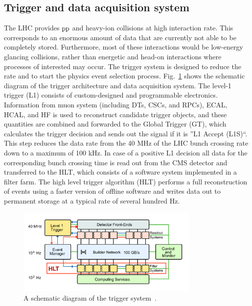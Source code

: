 \subsection*{Trigger and data acquisition system}
The LHC provides $\mathrm{p}\mathrm{p}$ and heavy-ion collisions at high interaction rate. This corresponds to an enormous amount of data that are currently not able to be completely stored. Furthermore, most of these interactions would be low-energy glancing collisions, rather than energetic and head-on interactions where processes of interested may occur. The trigger system is designed to reduce the rate and to start the physics event selection process. Fig.~\ref{fig:TrigSyst} shows the schematic diagram of the trigger architecture and data acquisition system. The level-1 trigger (L1) consists of custom-designed and programmable electronics. Information from muon system (including DTs, CSCs, and RPCs), ECAL, HCAL, and HF is used to reconstruct candidate trigger objects, and these quantities are combined and forwarded to the Global Trigger (GT), which calculates the trigger decision and sends out the signal if it is ''L1 Accept (L1S)``. This step reduces the data rate from the 40 \unit{MHz} of the LHC bunch crossing rate down to a maximum of 100 \unit{kHz}. 
In case of a positive L1 decision all data for the corresponding bunch crossing time is read out from the CMS detector and transferred to the HLT, which consists of a software system implemented in a filter farm. The high level trigger algorithm (HLT) performs a full reconstruction of events using a faster version of offline software and writes data out to permanent storage at a typical rate of several hundred \unit{Hz}.
\begin{figure}[!ht]
  \begin{center}
  \includegraphics[width=0.8\textwidth]{Fig/CMS_Detector/Trigger_architexture}
    \caption{A schematic diagram of the trigger system~\cite{Chatrchyan:2008aa}. \label{fig:TrigSyst}}
  \end{center}
\end{figure}

